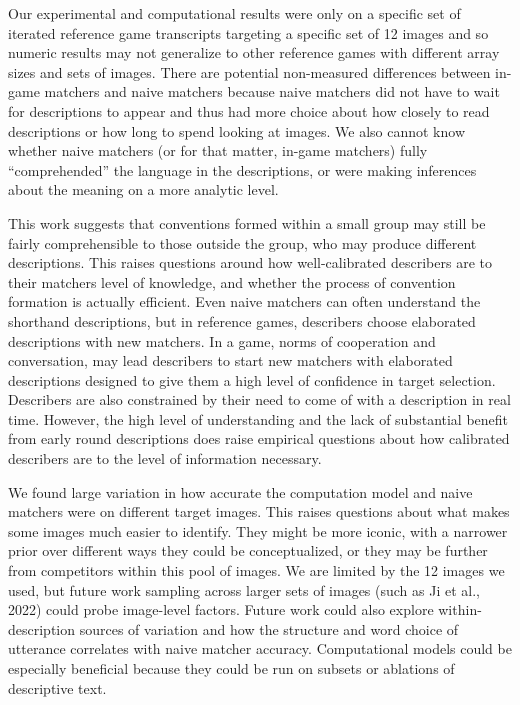 \documentclass[10pt, letterpaper]{article}
\begin{document}
Our experimental and computational results were only on a specific set
of iterated reference game transcripts targeting a specific set of 12
images and so numeric results may not generalize to other reference
games with different array sizes and sets of images. There are potential
non-measured differences between in-game matchers and naive matchers
because naive matchers did not have to wait for descriptions to appear
and thus had more choice about how closely to read descriptions or how
long to spend looking at images. We also cannot know whether naive
matchers (or for that matter, in-game matchers) fully ``comprehended''
the language in the descriptions, or were making inferences about the
meaning on a more analytic level.

This work suggests that conventions formed within a small group may
still be fairly comprehensible to those outside the group, who may
produce different descriptions. This raises questions around how
well-calibrated describers are to their matchers level of knowledge, and
whether the process of convention formation is actually efficient. Even
naive matchers can often understand the shorthand descriptions, but in
reference games, describers choose elaborated descriptions with new
matchers. In a game, norms of cooperation and conversation, may lead
describers to start new matchers with elaborated descriptions designed
to give them a high level of confidence in target selection. Describers
are also constrained by their need to come of with a description in real
time. However, the high level of understanding and the lack of
substantial benefit from early round descriptions does raise empirical
questions about how calibrated describers are to the level of
information necessary.

We found large variation in how accurate the computation model and naive
matchers were on different target images. This raises questions about
what makes some images much easier to identify. They might be more
iconic, with a narrower prior over different ways they could be
conceptualized, or they may be further from competitors within this pool
of images. We are limited by the 12 images we used, but future work
sampling across larger sets of images (such as Ji et al., 2022) could
probe image-level factors. Future work could also explore
within-description sources of variation and how the structure and word
choice of utterance correlates with naive matcher accuracy.
Computational models could be especially beneficial because they could
be run on subsets or ablations of descriptive text.
\end{document}
